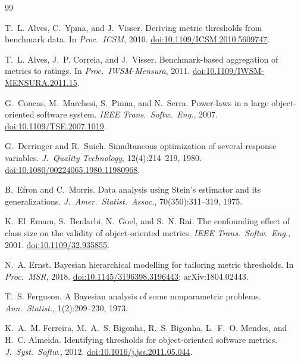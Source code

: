 \documentclass[11pt]{article}
\theoremstyle{remark}
\begin{document}
\begin{thebibliography}{99}

T.~L. Alves, C.~Ypma, and J.~Visser.
\newblock Deriving metric thresholds from benchmark data.
\newblock In \emph{Proc.\ ICSM}, 2010.
\newblock \href{https://doi.org/10.1109/ICSM.2010.5609747}{doi:10.1109/ICSM.2010.5609747}.

T.~L. Alves, J.~P. Correia, and J.~Visser.
\newblock Benchmark-based aggregation of metrics to ratings.
\newblock In \emph{Proc.\ IWSM-Mensura}, 2011.
\newblock \href{https://doi.org/10.1109/IWSM-MENSURA.2011.15}{doi:10.1109/IWSM-MENSURA.2011.15}.

G.~Concas, M.~Marchesi, S.~Pinna, and N.~Serra.
\newblock Power-laws in a large object-oriented software system.
\newblock \emph{IEEE Trans.\ Softw.\ Eng.}, 2007.
\newblock \href{https://doi.org/10.1109/TSE.2007.1019}{doi:10.1109/TSE.2007.1019}.

G.~Derringer and R.~Suich.
\newblock Simultaneous optimization of several response variables.
\newblock \emph{J.\ Quality Technology}, 12(4):214--219, 1980.
\newblock \href{https://doi.org/10.1080/00224065.1980.11980968}{doi:10.1080/00224065.1980.11980968}.

B.~Efron and C.~Morris.
\newblock Data analysis using {S}tein's estimator and its generalizations.
\newblock \emph{J.\ Amer.\ Statist.\ Assoc.}, 70(350):311--319, 1975.

K.~El~Emam, S.~Benlarbi, N.~Goel, and S.~N. Rai.
\newblock The confounding effect of class size on the validity of
  object-oriented metrics.
\newblock \emph{IEEE Trans.\ Softw.\ Eng.}, 2001.
\newblock \href{https://doi.org/10.1109/32.935855}{doi:10.1109/32.935855}.

N.~A. Ernst.
\newblock Bayesian hierarchical modelling for tailoring metric thresholds.
\newblock In \emph{Proc.\ MSR}, 2018.
\newblock \href{https://doi.org/10.1145/3196398.3196443}{doi:10.1145/3196398.3196443};
  arXiv:1804.02443.

T.~S. Ferguson.
\newblock A {B}ayesian analysis of some nonparametric problems.
\newblock \emph{Ann.\ Statist.}, 1(2):209--230, 1973.

K.~A.~M. Ferreira, M.~A.~S. Bigonha, R.~S. Bigonha, L.~F.~O. Mendes, and
  H.~C. Almeida.
\newblock Identifying thresholds for object-oriented software metrics.
\newblock \emph{J.\ Syst.\ Softw.}, 2012.
\newblock \href{https://doi.org/10.1016/j.jss.2011.05.044}{doi:10.1016/j.jss.2011.05.044}.


\end{thebibliography}
\end{document}
